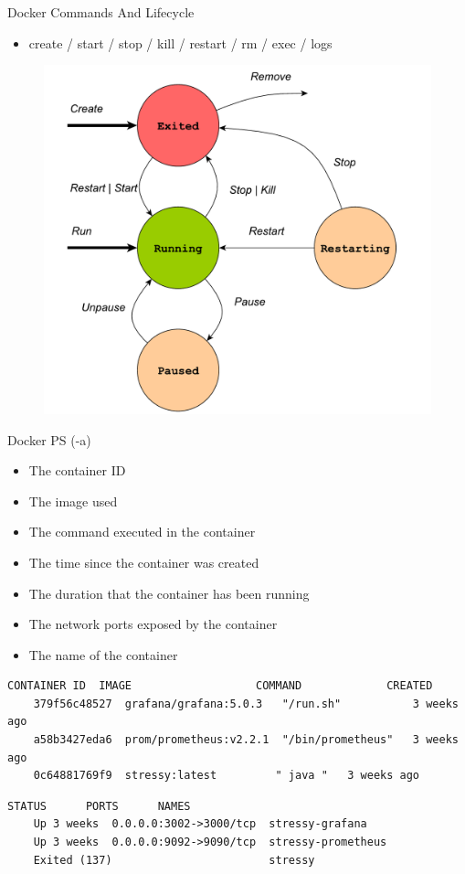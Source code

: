 \begin{frame}[fragile]{Docker Commands And Lifecycle}
  \begin{itemize}
    \item create / start / stop / kill / restart / rm / exec / logs
  \end{itemize}
  \begin{figure}
    \includegraphics[scale=0.3]{figures/container-states.pdf}
  \end{figure}
\end{frame}

\begin{frame}[fragile]{Docker PS (-a)}
  \begin{itemize}
    \item The container ID
    \item The image used
    \item The command executed in the container
    \item The time since the container was created
    \item The duration that the container has been running
    \item The network ports exposed by the container
    \item The name of the container
  \end{itemize}
  \begin{lstlisting}[basicstyle=\ttfamily\tiny\color{myblue}]
    CONTAINER ID  IMAGE                   COMMAND             CREATED
    379f56c48527  grafana/grafana:5.0.3   "/run.sh"           3 weeks ago  
    a58b3427eda6  prom/prometheus:v2.2.1  "/bin/prometheus"   3 weeks ago  
    0c64881769f9  stressy:latest         " java "   3 weeks ago  
  \end{lstlisting}
  \begin{lstlisting}[basicstyle=\ttfamily\tiny\color{myblue}]
    STATUS      PORTS      NAMES
    Up 3 weeks  0.0.0.0:3002->3000/tcp  stressy-grafana
    Up 3 weeks  0.0.0.0:9092->9090/tcp  stressy-prometheus
    Exited (137)                        stressy
  \end{lstlisting}
\end{frame}

